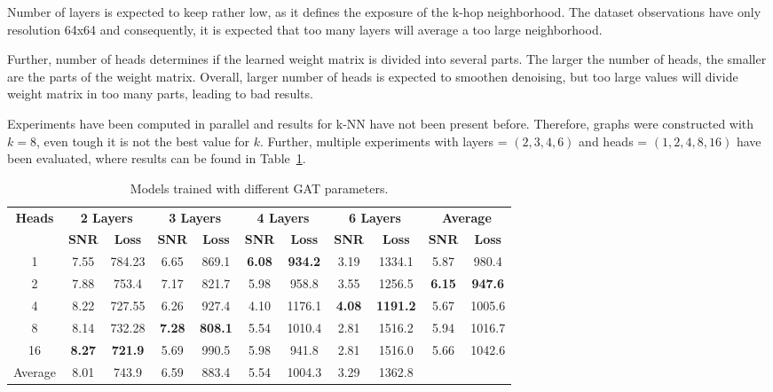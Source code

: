 Number of layers is expected to keep rather low, as it defines the exposure of the k-hop neighborhood.
The dataset observations have only resolution 64x64 and consequently, it is expected that too many layers will 
average a too large neighborhood.

Further, number of heads determines if the learned weight matrix is divided into several parts.
The larger the number of heads, the smaller are the parts of the weight matrix.
Overall, larger number of heads is expected to smoothen denoising, but too large values
will divide weight matrix in too many parts, leading to bad results.

Experiments have been computed in parallel and results for k-NN have not been present before. 
Therefore, graphs were constructed with $k=8$, even tough it is not the best value for $k$.
Further, multiple experiments with layers = $(2,3,4,6)$ and heads = $(1,2,4,8,16)$ have been evaluated, 
where results can be found in Table~\ref{tab:small_gat_results}.

\begin{table}[H]
  \centering
  \begin{tabular}{c|cc|cc|cc|cc|cc}
    \toprule
    \textbf{Heads} & \multicolumn{2}{c|}{\footnotesize \textbf{2 Layers}} & \multicolumn{2}{c|}{\footnotesize \textbf{3 Layers}} & \multicolumn{2}{c|}{\footnotesize \textbf{4 Layers}} & \multicolumn{2}{c|}{\footnotesize \textbf{6 Layers}} & \multicolumn{2}{c}{\footnotesize \textbf{Average}} \\
                   & \textbf{SNR} & \textbf{Loss} & \textbf{SNR} & \textbf{Loss} & \textbf{SNR} & \textbf{Loss} & \textbf{SNR} & \textbf{Loss} & \textbf{SNR} & \textbf{Loss} \\ 
    \midrule
    1    &  7.55	         & 784.23          & 6.65	          & 869.1          & \textbf{6.08}	& \textbf{934.2}  & 3.19	        & 1334.1          & 5.87 & 980.4 \\ \hline
    2    &  7.88	         & 753.4           & 7.17	          & 821.7          & 5.98	          & 958.8           & 3.55	        & 1256.5          & \textbf{6.15} & \textbf{947.6} \\ \hline
    4    &  8.22	         & 727.55          & 6.26	          & 927.4          & 4.10	          & 1176.1          & \textbf{4.08}	& \textbf{1191.2} & 5.67 & 1005.6 \\ \hline
    8    &  8.14 	         & 732.28          & \textbf{7.28}	& \textbf{808.1} & 5.54	          & 1010.4          & 2.81	        & 1516.2          & 5.94 & 1016.7 \\ \hline
    16   &  \textbf{8.27}  & \textbf{721.9}  & 5.69	          & 990.5          & 5.98	          & 941.8           & 2.81	        & 1516.0          & 5.66 & 1042.6 \\ \hline
    
    Average  &  8.01 & 743.9 & 6.59 & 883.4 & 5.54 & 1004.3 & 3.29 & 1362.8   \\ 
    \midrule
  \end{tabular}
  \caption{Models trained with different GAT parameters. }
  \label{tab:small_gat_results}
\end{table}



